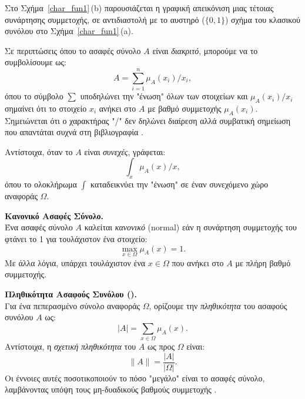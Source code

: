 Στο Σχήμα~\ref{char_fun1}\,(\textlatin{b}) παρουσιάζεται η γραφική απεικόνιση μιας τέτοιας συνάρτησης συμμετοχής, σε αντιδιαστολή με το αυστηρό (\(\{0,1\}\)) σχήμα του κλασικού συνόλου στο Σχήμα~\ref{char_fun1}\,(\textlatin{a}). 

\medskip
Σε περιπτώσεις όπου το ασαφές σύνολο \(A\) είναι \emph{διακριτό}, μπορούμε να το συμβολίσουμε ως:
\begin{equation}
\label{eq:2}
A = \sum_{i=1}^{n} \mu_{A}(x_{i})/x_{i},
\end{equation}
όπου το σύμβολο \(\sum\) υποδηλώνει την "ένωση" όλων των στοιχείων και \(\mu_{A}(x_{i})/x_{i}\) σημαίνει ότι το στοιχείο \(x_{i}\) ανήκει στο \(A\) με βαθμό συμμετοχής \(\mu_{A}(x_{i})\). Σημειώνεται ότι ο χαρακτήρας "/" δεν δηλώνει διαίρεση αλλά συμβατική σημείωση που απαντάται συχνά στη βιβλιογραφία \cite{DuboisPrade1980}.

\medskip
Αντίστοιχα, όταν το \(A\) είναι \emph{συνεχές}, γράφεται:
\begin{equation}
\label{eq:3}
\int_{x} \mu_{A}(x)/x,
\end{equation}
όπου το ολοκλήρωμα \(\int\) καταδεικνύει την "ένωση" σε έναν συνεχόμενο χώρο αναφοράς \(\Omega\).

\begin{definition}
	\label{def:normal}
	\textbf{Κανονικό Ασαφές Σύνολο.}\\
	Ένα ασαφές σύνολο \(A\) καλείται \emph{κανονικό} (\textlatin{normal}) εάν η συνάρτηση συμμετοχής του φτάνει το 1 για τουλάχιστον ένα στοιχείο:
	\begin{equation}
	\label{eq:4}
	\max_{x \in \Omega} \mu_{A}(x) = 1.
	\end{equation}
	Με άλλα λόγια, υπάρχει τουλάχιστον ένα \(x \in \Omega\) που ανήκει στο \(A\) με πλήρη βαθμό συμμετοχής.
\end{definition}

\begin{definition}
	\textbf{Πληθικότητα Ασαφούς Συνόλου ().}\\
	Για ένα πεπερασμένο σύνολο αναφοράς \(\Omega\), ορίζουμε την \emph{πληθικότητα} του ασαφούς συνόλου \(A\) ως:
	\begin{equation}
	\label{eq:5}
	|A| = \sum_{x \in \Omega} \mu_{A}(x).
	\end{equation}
	Αντίστοιχα, η \emph{σχετική πληθικότητα} του \(A\) ως προς \(\Omega\) είναι:
	\begin{equation}
	\|A\| = \frac{|A|}{|\Omega|}.
	\end{equation}
	Οι έννοιες αυτές ποσοτικοποιούν το πόσο "μεγάλο" είναι το ασαφές σύνολο, λαμβάνοντας υπόψη τους μη-δυαδικούς βαθμούς συμμετοχής \cite{KlirYuan}.
\end{definition}

